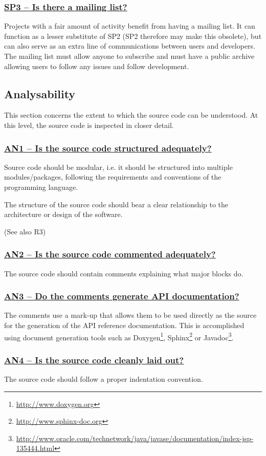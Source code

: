 \documentclass[a4paper,11pt]{article}
\newcommand{\indicator}[1]{\subsubsection*{\underline{#1}}}
\begin{document}
\indicator{SP3 -- Is there a mailing list?}

Projects with a fair amount of activity benefit from having a mailing list. It
can function as a lesser substitute of SP2 (SP2 therefore may make this
obsolete), but can also serve as an extra line of communications between users
and developers. The mailing list must allow anyone to subscribe and must have a
public archive allowing users to follow any issues and follow development.

\subsection{Analysability}

This section concerns the extent to which the source code can be understood. At
this level, the source code is inspected in closer detail.

\indicator{AN1 -- Is the source code structured adequately?}

Source code should be modular, i.e. it should be structured into multiple
modules/packages, following the requirements and conventions of the programming
language. 

The structure of the source code should bear a clear relationship to the
architecture or design of the software.

(See also R3)

\indicator{AN2 -- Is the source code commented adequately?}

The source code should contain comments explaining what major blocks do.

\indicator{AN3 -- Do the comments generate API documentation?}

The comments use a mark-up that allows them to be used directly as the
source for the generation of the API reference documentation. This is
%
%
%
accomplished using document generation tools such as Doxygen\footnote{\url{http://www.doxygen.org}}, Sphinx\footnote{\url{http://www.sphinx-doc.org}} or
Javadoc\footnote{\url{http://www.oracle.com/technetwork/java/javase/documentation/index-jsp-135444.html}}.

\indicator{AN4 -- Is the source code cleanly laid out?}

The source code should follow a proper indentation convention. 
\end{document}
